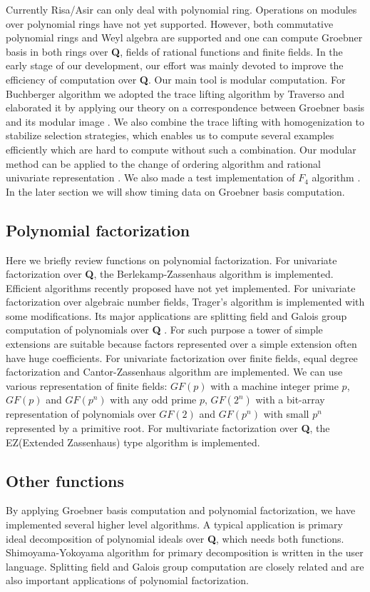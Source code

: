 \documentclass[runningheads]{cl2emult}
\begin{document}
Currently Risa/Asir can only deal with polynomial ring. Operations on
modules over polynomial rings have not yet supported.  However, both
commutative polynomial rings and Weyl algebra are supported and one
can compute Groebner basis in both rings over {\bf Q}, fields of
rational functions and finite fields. In the early stage of our
development, our effort was mainly devoted to improve the efficiency
of computation over {\bf Q}. Our main tool is modular
computation. For Buchberger algorithm we adopted the trace lifting
algorithm by Traverso \cite{TRAV} and elaborated it by applying our
theory on a correspondence between Groebner basis and its modular
image \cite{NOYO}. We also combine the trace lifting with
homogenization to stabilize selection strategies, which enables us to
compute several examples efficiently which are hard to compute without
such a combination.  Our modular method can be applied to the change
of ordering algorithm\cite{FGLM} and rational univariate
representation \cite{RUR}.  We also made a test implementation of
$F_4$ algorithm \cite{F4}. In the later section we will show timing
data on Groebner basis computation.

\subsection{Polynomial factorization}

Here we briefly review functions on polynomial factorization.  For
univariate factorization over {\bf Q}, the Berlekamp-Zassenhaus
algorithm is implemented.  Efficient algorithms recently proposed have
not yet implemented.  For univariate factorization over algebraic
number fields, Trager's algorithm \cite{TRAGER} is implemented with
some modifications.  Its major applications are splitting field and
Galois group computation of polynomials over {\bf Q} \cite{ANY}. For
such purpose a tower of simple extensions are suitable because factors
represented over a simple extension often have huge coefficients.  For
univariate factorization over finite fields, equal degree
factorization and Cantor-Zassenhaus algorithm are implemented. We can
use various representation of finite fields: $GF(p)$ with a machine
integer prime $p$, $GF(p)$ and $GF(p^n)$ with any odd prime $p$,
$GF(2^n)$ with a bit-array representation of polynomials over $GF(2)$
and $GF(p^n)$ with small $p^n$ represented by a primitive root.  For
multivariate factorization over {\bf Q}, the EZ(Extended Zassenhaus)
type algorithm is implemented.

\subsection{Other functions}
By applying Groebner basis computation and polynomial factorization,
we have implemented several higher level algorithms. A typical
application is primary ideal decomposition of polynomial ideals over
{\bf Q}, which needs both functions.  Shimoyama-Yokoyama algorithm
\cite{SY} for primary decomposition is written in the user language.
Splitting field and Galois group computation \cite{ANY} are closely
related and are also important applications of polynomial
factorization.
\end{document}
